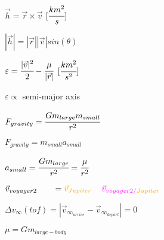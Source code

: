 \documentclass{article}
\begin{document}
\color{cyan}
\begin{center}\huge{
$
\vec{h}=\vec{r} \times \vec{v}
$
      $[\cfrac{km^2}{s}]$
}\end{center}

\begin{center}\huge{
$
|\vec{h}|=|\vec{r}| |\vec{v}| sin(\theta)
$
}\end{center}

\color{green}
\begin{center}\huge{
$
\varepsilon=\cfrac{|\vec{v}|^2}{2} - \cfrac{\mu}{|\vec{r}|}
$
   $\space\space\space [\cfrac{km^2}{s^2}]$
}\end{center}


\color{green}
\begin{center}\huge{
$
\varepsilon \propto $ semi-major axis$
$
}\end{center}

\color{magenta}
\begin{center}\huge{
$
F_{gravity}=\cfrac{Gm_{large}m_{small}}{r^2}
$
}\end{center}

\color{magenta}
\begin{center}\huge{
$
F_{gravity}=m_{small}a_{small}
$
}\end{center}

\color{magenta}
\begin{center}\huge{
$
a_{small}=\cfrac{Gm_{large}}{r^2}=\cfrac{\mu}{r^2}
$
}\end{center}


\color{magenta}
\begin{center}\huge{
$
\vec{v}_{voyager2 \color{white}/Sun}=
\color{orange}\vec{v}_{Jupiter}
\color{white}+
\color{magenta}\vec{v}_{voyager2/ \color{orange}Jupiter}
$
}\end{center}


\color{magenta}
\begin{center}\huge{
$
\Delta v_{\infty}(tof)=|\vec{v}_{\infty_{arrive}}-\vec{v}_{\infty_{depart}}|=0
$
}\end{center}

\color{green}
\begin{center}\huge{
$
\mu=Gm_{large-body}
$
}\end{center}
\end{document}
